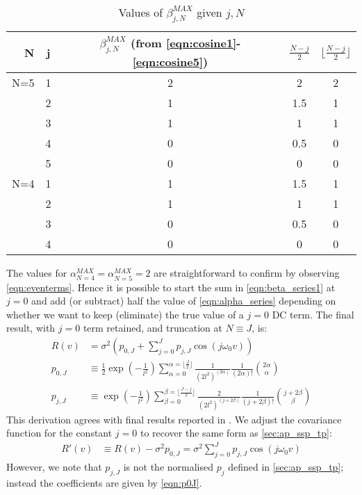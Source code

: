 \begin{table}[h]
	\centering
	\begin{tabular}{rc|c|cc} 
		\hline
		N & j & $\beta_{j,N}^{MAX}$ (from \ref{eqn:cosine1}-\ref{eqn:cosine5}) & $\frac{N-j}{2}$ & $\lfloor\frac{N-j}{2}\rfloor$ \\
		\hline
		N=5 & 1& 2& 2 & 2 \\
			& 2& 1& 1.5 & 1 \\
			& 3& 1& 1 & 1 \\
			& 4& 0& 0.5 & 0 \\
			& 5& 0& 0 & 0 \\
		\hline
		N=4 & 1& 1& 1.5 & 1 \\
			& 2& 1& 1 & 1 \\
			& 3& 0& 0.5 & 0 \\
			& 4& 0& 0 & 0 \\
		\hline
	\end{tabular}
	\caption[Covariance Functions: Values of $\beta_{j,N}^{MAX}$ given $j,N$ ]{Values of $\beta_{j,N}^{MAX}$ given $j,N$}
	\label{tab:truncation_n}
\end{table}
The values for $\alpha_{N=4}^{MAX} = \alpha_{N=5}^{MAX} = 2$ are straightforward to confirm by observing \ref{eqn:eventerms}. Hence it is possible to start the sum in \ref{eqn:beta_series1} at $j=0$ and add (or subtract) half the value of \ref{eqn:alpha_series} depending on whether we want to keep (eliminate) the true value of a $j=0$ DC term. The final result, with $j=0$ term retained, and truncation at $N \equiv J$, is:
\begin{align}
R(v) &= \sigma^2 (p_{0,J} + \sum_{j=0}^{J} p_{j,J} \cos(j\omega_0 v))\\
p_{0,J} & \equiv \frac{1}{2} \exp (- \frac{1}{l^2}) \sum_{\alpha = 0}^{\alpha = \lfloor\frac{J}{2}\rfloor} \frac{1}{(2l^2)^{(2\alpha)}} \frac{1}{(2\alpha)!} \binom{2\alpha}{\alpha} \label{eqn:p0J}\\
p_{j,J} & \equiv \exp (- \frac{1}{l^2}) \sum_{\beta = 0}^{\beta = \lfloor\frac{J-j}{2}\rfloor} \frac{2}{(2l^2)^{(j + 2\beta)}} \frac{1}{(j + 2\beta)!} \binom{j + 2\beta}{\beta} \label{eqn:pjJ}
\end{align}
This derivation agrees with final results reported in \cite{solin2014}. We adjust the covariance function for the constant $j=0$ to recover the same form as \ref{sec:ap_ssp_tp}:
\begin{align}
R'(v) & \equiv R(v) - \sigma^2 p_{0,J} = \sigma^2 \sum_{j=0}^{J} p_{j,J} \cos(j\omega_0 v) 
\end{align}
However, we note that $p_{j,J}$ is not the normalised $p_j$ defined in  \ref{sec:ap_ssp_tp}; instead the coefficients are given by \ref{eqn:p0J}.


